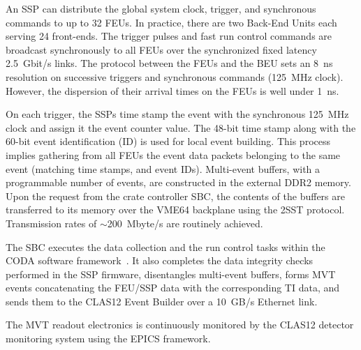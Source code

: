 An SSP can distribute the global system clock, trigger, and synchronous commands to up to 32 FEUs. In practice, there are
two Back-End Units each serving 24 front-ends. The trigger pulses and fast run control commands are broadcast synchronously
to all FEUs over the synchronized fixed latency 2.5~Gbit/s links. The protocol between the FEUs and the BEU sets an 8~ns
resolution on successive triggers and synchronous commands (125~MHz clock). However, the dispersion of their arrival times
on the FEUs is well under 1~ns.

On each trigger, the SSPs time stamp the event with the synchronous 125~MHz clock and assign it the event counter value. The
48-bit time stamp along with the 60-bit event identification (ID) is used for local event building. This process implies gathering from all FEUs
the event data packets belonging to the same event (matching time stamps, and event IDs). Multi-event buffers, with a
programmable number of events, are constructed in the external DDR2 memory. Upon the request from the crate controller
SBC, the contents of the buffers are transferred to its memory over the VME64 backplane using the 2SST protocol. Transmission
rates of $\sim$200~Mbyte/s are routinely achieved.

The SBC executes the data collection and the run control tasks within the CODA software framework~\cite{daq-nim}. It 
also
completes the data integrity checks performed in the SSP firmware, disentangles multi-event buffers, forms MVT events
concatenating the FEU/SSP data with the corresponding TI data, and sends them to the CLAS12 Event Builder over a 10~GB/s
Ethernet link.

The MVT readout electronics is continuously monitored by the CLAS12 detector monitoring system using the EPICS framework.
